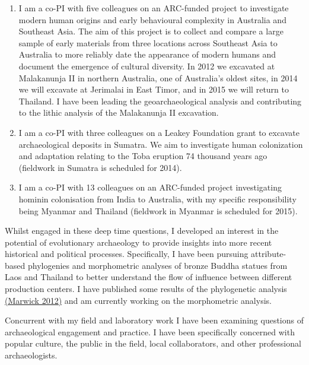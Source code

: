 \documentclass[11pt,article,oneside]{memoir}
\begin{document}
\begin{enumerate}

\item I am a co-PI with five colleagues on an ARC-funded project to investigate modern human origins and early behavioural complexity in Australia and Southeast Asia. The aim of this project is to collect and compare a large sample of early materials from three locations across Southeast Asia to Australia to more reliably date the appearance of modern humans and document the emergence of cultural diversity. In 2012 we excavated at Malakanunja II in northern Australia, one of Australia's oldest sites, in 2014 we will excavate at Jerimalai in East Timor, and in 2015 we will return to Thailand. I have been leading the geoarchaeological analysis and contributing to the lithic analysis of the Malakanunja II excavation. 

\item I am a co-PI with three colleagues on a Leakey Foundation grant to excavate archaeological deposits in Sumatra. We aim to investigate human colonization and adaptation relating to the Toba eruption 74 thousand years ago (fieldwork in Sumatra is scheduled for 2014). 

\item I am a co-PI with 13 colleagues on an ARC-funded project investigating hominin colonisation from India to Australia, with my specific responsibility being Myanmar and Thailand (fieldwork in Myanmar is scheduled for 2015).

\end{enumerate}

Whilst engaged in these deep time questions, I developed an interest in the potential of evolutionary archaeology to provide insights into more recent historical and political processes.  Specifically, I have been pursuing attribute-based phylogenies and morphometric analyses of bronze Buddha statues from Laos and Thailand to better understand the flow of influence between different production centers. I have published some results of the phylogenetic analysis \href{http://faculty.washington.edu/bmarwick/PDFs/Marwick_2012_Buddha_cladistics.pdf}{(Marwick 2012)} and am currently working on the morphometric analysis. 

Concurrent with my field and laboratory work I have been examining questions of archaeological engagement and practice. I have been specifically concerned with popular culture, the public in the field, local collaborators, and other professional archaeologists. 
\end{document}
